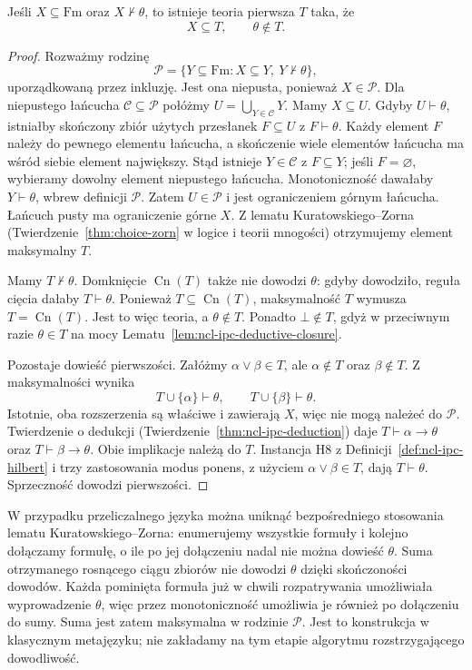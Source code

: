 \begin{twierdzenie}
\label{thm:ncl-ipc-prime-extension}
Jeśli $X\subseteq\mathrm{Fm}$ oraz $X\nvdash\theta$,
to istnieje teoria pierwsza $T$ taka, że
\[
 X\subseteq T,\qquad \theta\notin T.
\]
\end{twierdzenie}
\begin{proof}
Rozważmy rodzinę
\[
 \mathcal P=\{Y\subseteq\mathrm{Fm}:
                     X\subseteq Y,\ Y\nvdash\theta\},
\]
uporządkowaną przez inkluzję.
Jest ona niepusta, ponieważ $X\in\mathcal P$.
Dla niepustego łańcucha $\mathcal C\subseteq\mathcal P$
połóżmy $U=\bigcup_{Y\in\mathcal C}Y$.
Mamy $X\subseteq U$. Gdyby $U\vdash\theta$,
istniałby skończony zbiór użytych przesłanek
$F\subseteq U$ z $F\vdash\theta$.
Każdy element $F$ należy do pewnego elementu
łańcucha, a skończenie wiele elementów łańcucha
ma wśród siebie element największy.
Stąd istnieje $Y\in\mathcal C$ z $F\subseteq Y$;
jeśli $F=\varnothing$, wybieramy dowolny element
niepustego łańcucha. Monotoniczność dawałaby
$Y\vdash\theta$, wbrew definicji $\mathcal P$.
Zatem $U\in\mathcal P$ i jest ograniczeniem górnym
łańcucha. Łańcuch pusty ma ograniczenie górne $X$.
Z lematu Kuratowskiego--Zorna
(Twierdzenie~\ref{thm:choice-zorn} w logice i teorii
mnogości) otrzymujemy element maksymalny $T$.

Mamy $T\nvdash\theta$. Domknięcie
$\operatorname{Cn}(T)$ także nie dowodzi $\theta$:
gdyby dowodziło, reguła cięcia dałaby $T\vdash\theta$.
Ponieważ $T\subseteq\operatorname{Cn}(T)$,
maksymalność $T$ wymusza
$T=\operatorname{Cn}(T)$. Jest to więc teoria,
a $\theta\notin T$. Ponadto $\bot\notin T$,
gdyż w przeciwnym razie $\theta\in T$ na mocy
Lematu~\ref{lem:ncl-ipc-deductive-closure}.

Pozostaje dowieść pierwszości. Załóżmy
$\alpha\vee\beta\in T$, ale $\alpha\notin T$
oraz $\beta\notin T$. Z maksymalności wynika
\[
 T\cup\{\alpha\}\vdash\theta,\qquad
 T\cup\{\beta\}\vdash\theta.
\]
Istotnie, oba rozszerzenia są właściwe i zawierają
$X$, więc nie mogą należeć do $\mathcal P$.
Twierdzenie o dedukcji
(Twierdzenie~\ref{thm:ncl-ipc-deduction})
daje $T\vdash\alpha\to\theta$ oraz
$T\vdash\beta\to\theta$.
Obie implikacje należą do $T$. Instancja H8
z Definicji~\ref{def:ncl-ipc-hilbert} i trzy
zastosowania modus ponens, z użyciem
$\alpha\vee\beta\in T$, dają $T\vdash\theta$.
Sprzeczność dowodzi pierwszości.
\end{proof}
W przypadku przeliczalnego języka można uniknąć
bezpośredniego stosowania lematu Kuratowskiego--Zorna:
enumerujemy wszystkie formuły i kolejno dołączamy
formułę, o ile po jej dołączeniu nadal nie można
dowieść $\theta$. Suma otrzymanego rosnącego ciągu
zbiorów nie dowodzi $\theta$ dzięki skończoności
dowodów. Każda pominięta formuła już w chwili
rozpatrywania umożliwiała wyprowadzenie $\theta$,
więc przez monotoniczność umożliwia je również
po dołączeniu do sumy. Suma jest zatem maksymalna
w rodzinie $\mathcal P$. Jest to konstrukcja
w klasycznym metajęzyku; nie zakładamy na tym
etapie algorytmu rozstrzygającego dowodliwość.

